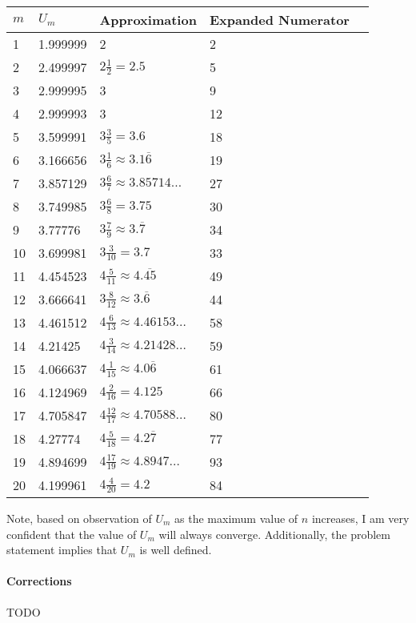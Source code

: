 \documentclass{report}
\begin{document}
			\begin{table}[h]
				\begin{tabular}{lllll}
					$m$ & $U_m$ & Approximation & Expanded Numerator \\
					\hline
					1 & 1.999999 & 2 & 2 \\
					2 & 2.499997 & $2\frac{1}{2} = 2.5$ & 5 \\
					3 & 2.999995 & 3 & 9 \\
					4 & 2.999993 & 3 & 12 \\
					5 & 3.599991 & $3\frac{3}{5} = 3.6$ & 18 \\
					6 & 3.166656 & $3 \frac{1}{6} \approx 3.1\overline{6}$ & 19\\
					7 & 3.857129 & $3 \frac{6}{7} \approx 3.85714\dots$ & 27 \\
					8 & 3.749985 & $3 \frac{6}{8} = 3.75$ & 30\\
					9 & 3.77776 & $3 \frac{7}{9} \approx 3.\overline{7}$ & 34\\
					10 & 3.699981 & $3 \frac{3}{10} = 3.7$ & 33\\
					11 & 4.454523 & $4 \frac{5}{11} \approx 4.\overline{45}$ & 49 \\
					12 & 3.666641 & $3 \frac{8}{12} \approx 3.\overline{6}$ & 44 \\
					13 & 4.461512 & $4 \frac{6}{13} \approx 4.46153\dots$ & 58 \\
					14 & 4.21425 & $4 \frac{3}{14} \approx 4.21428\dots$ & 59 \\
					15 & 4.066637 & $4 \frac{1}{15} \approx 4.0\overline{6}$ & 61 \\
					16 & 4.124969 & $4 \frac{2}{16} = 4.125$ & 66 \\
					17 & 4.705847 & $4 \frac{12}{17} \approx 4.70588\dots$ & 80 \\
					18 & 4.27774 & $4 \frac{5}{18} = 4.2\overline{7}$ & 77 \\
					19 & 4.894699 & $4 \frac{17}{19} \approx 4.8947\dots$ & 93 \\
					20 & 4.199961 & $4 \frac{4}{20} = 4.2$ & 84 \\
				\end{tabular}
			\end{table}
			
			Note, based on observation of $U_m$ as the maximum value of $n$ increases, I am very confident that the value of $U_m$ will always converge. Additionally, the problem statement implies that $U_m$ is well defined.
			
			
			\paragraph{Corrections} TODO
			
\end{document}
